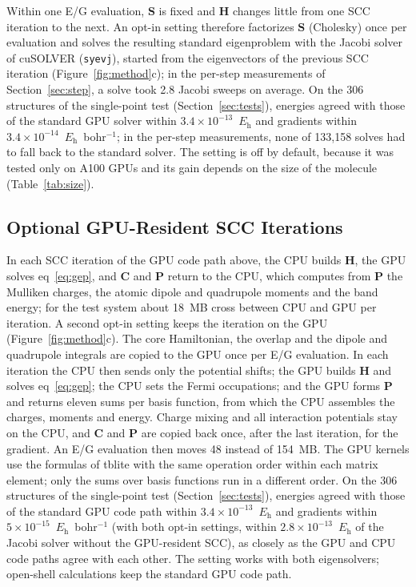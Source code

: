 \documentclass[journal=jctcce,manuscript=article]{achemso}
\newcommand{\Eh}{\ensuremath{E_\mathrm{h}}}
\begin{document}
Within one E/G evaluation, $\mathbf{S}$ is fixed and $\mathbf{H}$ changes little from one SCC iteration to the next. An opt-in setting therefore factorizes $\mathbf{S}$ (Cholesky) once per evaluation and solves the resulting standard eigenproblem with the Jacobi solver of cuSOLVER (\texttt{syevj}), started from the eigenvectors of the previous SCC iteration (Figure~\ref{fig:method}c); in the per-step measurements of Section~\ref{sec:step}, a solve took 2.8 Jacobi sweeps on average. On the 306 structures of the single-point test (Section~\ref{sec:tests}), energies agreed with those of the standard GPU solver within $3.4\times10^{-13}$~\Eh{} and gradients within $3.4\times10^{-14}$~\Eh~bohr$^{-1}$; in the per-step measurements, none of 133,158 solves had to fall back to the standard solver. The setting is off by default, because it was tested only on A100 GPUs and its gain depends on the size of the molecule (Table~\ref{tab:size}).

\subsection{Optional GPU-Resident SCC Iterations}
\label{sec:devscc}

In each SCC iteration of the GPU code path above, the CPU builds $\mathbf{H}$, the GPU solves eq~\ref{eq:gep}, and $\mathbf{C}$ and $\mathbf{P}$ return to the CPU, which computes from $\mathbf{P}$ the Mulliken charges, the atomic dipole and quadrupole moments and the band energy; for the test system about 18~MB cross between CPU and GPU per iteration. A second opt-in setting keeps the iteration on the GPU (Figure~\ref{fig:method}c). The core Hamiltonian, the overlap and the dipole and quadrupole integrals are copied to the GPU once per E/G evaluation. In each iteration the CPU then sends only the potential shifts; the GPU builds $\mathbf{H}$ and solves eq~\ref{eq:gep}; the CPU sets the Fermi occupations; and the GPU forms $\mathbf{P}$ and returns eleven sums per basis function, from which the CPU assembles the charges, moments and energy. Charge mixing and all interaction potentials stay on the CPU, and $\mathbf{C}$ and $\mathbf{P}$ are copied back once, after the last iteration, for the gradient. An E/G evaluation then moves 48 instead of 154~MB. The GPU kernels use the formulas of tblite with the same operation order within each matrix element; only the sums over basis functions run in a different order. On the 306 structures of the single-point test (Section~\ref{sec:tests}), energies agreed with those of the standard GPU code path within $3.4\times10^{-13}$~\Eh{} and gradients within $5\times10^{-15}$~\Eh~bohr$^{-1}$ (with both opt-in settings, within $2.8\times10^{-13}$~\Eh{} of the Jacobi solver without the GPU-resident SCC), as closely as the GPU and CPU code paths agree with each other. The setting works with both eigensolvers; open-shell calculations keep the standard GPU code path.
\end{document}
